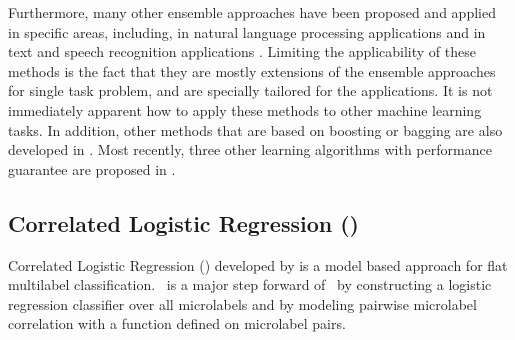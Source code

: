 {Furthermore, many other ensemble approaches have been proposed and applied in specific areas, including, in natural language processing applications \citep{Collins05distrimnative,Zeman05improving,Sagae06parsing,Zhang09kbest} and 
in text and speech recognition applications \citep{Fiscus97a,Benesty08speech,Petrov10products}.
Limiting the applicability of these methods is the fact that they are mostly extensions of the ensemble approaches for single task problem, and are specially tailored for the applications.
It is not immediately apparent how to apply these methods to other machine learning tasks.
In addition, other methods that are based on boosting or bagging are also developed in \citep{Wang07simple,Kocev13tree}.
Most recently, three other learning algorithms with performance guarantee are proposed in \citep{Cortes14semble}.




%
%
\subsection{Correlated Logistic Regression (\corrlog)}

Correlated Logistic Regression (\corrlog) developed by \citet{Bian12corrlog} is a model based approach for flat multilabel classification.
\corrlog\ is a major step forward of \iblr\ by constructing a logistic regression classifier over all microlabels and by modeling pairwise microlabel correlation with a function defined on microlabel pairs.

}
